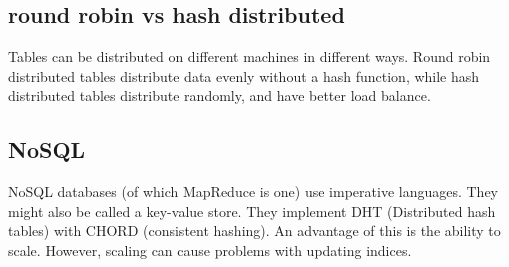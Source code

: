 \documentclass[twoside]{article}
\begin{document}
\subsection{round robin vs hash distributed}
Tables can be distributed on different machines in different ways. Round robin distributed tables distribute data evenly without a hash function, while hash distributed tables distribute randomly, and have better load balance.

\subsection{NoSQL}
NoSQL databases (of which MapReduce is one) use imperative languages. They might also be called a key-value store. They implement DHT (Distributed hash tables) with CHORD (consistent hashing). An advantage of this is the ability to scale. However, scaling can cause problems with updating indices.
\end{document}
